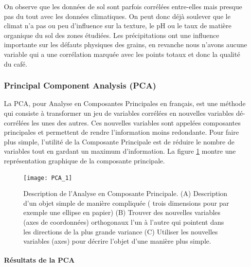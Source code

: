 \noindent On observe que les données de sol sont parfois corrélées entre-elles mais presque pas du tout avec les données climatiques. On peut donc déjà soulever que le climat n'a pas ou peu d'influence sur la texture, le pH ou le taux de matière organique du sol des zones étudiées. Les précipitations ont une influence importante sur les défauts physiques des grains, en revanche nous n'avons aucune variable qui a une corrélation marquée avec les points totaux et donc la qualité du café.   






\newpage
\subsubsection{Principal Component Analysis (PCA)}\label{PCAss}
La PCA, pour Analyse en Composantes Principales en français, est une méthode qui consiste à transformer un jeu de variables corrélées en nouvelles variables dé-corrélées les unes des autres. Ces nouvelles variables sont appelées composantes principales et permettent de rendre l'information moins redondante. Pour faire plus simple, l'utilité de la Composante Principale est de réduire le nombre de variables tout en gardant un maximum d'information. La figure \ref{PCAdefinition} montre une représentation graphique de la composante principale. 


\begin{figure}[H]
	\texttt{[image: PCA\_1]}
	\caption{\label{PCAdefinition} Description de l'Analyse en Composante Principale. (A) Description d'un objet simple de manière compliquée ( trois dimensions pour par exemple une ellipse en papier) (B) Trouver des nouvelles variables (axes de coordonnées) orthogonaux l'un à l'autre qui pointent dans les directions de la plus grande variance (C) Utiliser les nouvelles variables (axes) pour décrire l'objet d'une manière plus simple. }
\end{figure}

\paragraph{Résultats de la PCA}

